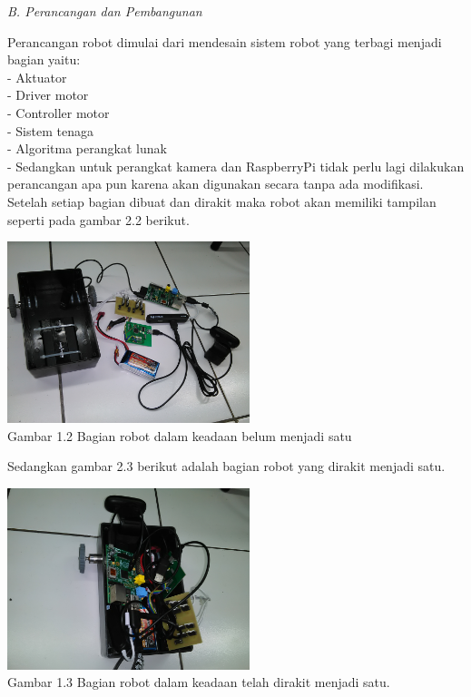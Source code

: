 \documentclass[10pt,journal,compsoc]{IEEEtran}
\begin{document}
  \noindent \textit{B. Perancangan dan Pembangunan}
  
  Perancangan robot dimulai dari mendesain sistem robot yang terbagi menjadi bagian yaitu:\\
  - Aktuator\\
  - Driver motor\\
  - Controller motor\\
  - Sistem tenaga\\
  - Algoritma perangkat lunak\\
  - Sedangkan untuk perangkat kamera dan RaspberryPi tidak perlu lagi dilakukan perancangan apa pun karena akan digunakan secara tanpa ada modifikasi.\\
  
  Setelah setiap bagian dibuat dan dirakit maka robot akan memiliki tampilan seperti pada gambar 2.2 berikut.
  
  \begin{center}
    \includegraphics[width=200pt]{apart}\\
    Gambar 1.2 Bagian robot dalam keadaan belum menjadi satu
  \end{center}
  
  Sedangkan gambar 2.3 berikut adalah bagian robot yang dirakit menjadi satu.
  \begin{center}
    \includegraphics[width=200pt]{full}\\
    Gambar 1.3 Bagian robot dalam keadaan telah dirakit menjadi satu.
  \end{center}
  
\end{document}
